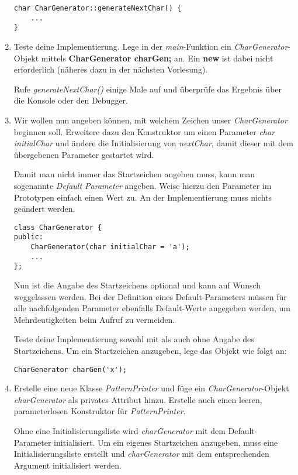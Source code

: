 \documentclass[
  accentcolor=tud1c,	%
  colorbacktitle,		%
  inverttitle,			%
  german,				%
  twoside
]{tudexercise}
\begin{document}
\begin{enumerate}
\begin{lstlisting}
char CharGenerator::generateNextChar() {
	...
}
\end{lstlisting}

\item
Teste deine Implementierung.
Lege in der \emph{main}-Funktion ein \emph{CharGenerator}-Objekt mittels \textbf{CharGenerator charGen;} an.
Ein \textbf{new} ist dabei nicht erforderlich (näheres dazu in der nächsten Vorlesung).

Rufe \emph{generateNextChar()} einige Male auf und überprüfe das Ergebnis über die Konsole oder den Debugger.

\item
Wir wollen nun angeben können, mit welchem Zeichen unser \emph{CharGenerator} beginnen soll.
Erweitere dazu den Konstruktor um einen Parameter \emph{char initialChar} und ändere die Initialisierung von \emph{nextChar}, damit dieser mit dem übergebenen Parameter gestartet wird.

Damit man nicht immer das Startzeichen angeben muss, kann man sogenannte \emph{Default Parameter} angeben.
Weise hierzu den Parameter im Prototypen einfach einen Wert zu.
An der Implementierung muss nichts geändert werden.
\begin{lstlisting}
class CharGenerator {
public:
	CharGenerator(char initialChar = 'a');
	...
};
\end{lstlisting}

Nun ist die Angabe des Startzeichens optional und kann auf Wunsch weggelassen werden.
Bei der Definition eines Default-Parameters müssen für alle nachfolgenden Parameter ebenfalls Default-Werte angegeben werden, um Mehrdeutigkeiten beim Aufruf zu vermeiden. 

Teste deine Implementierung sowohl mit als auch ohne Angabe des Startzeichens.
Um ein Startzeichen anzugeben, lege das Objekt wie folgt an:
\begin{lstlisting}
CharGenerator charGen('x');
\end{lstlisting}


\item
Erstelle eine neue Klasse \emph{PatternPrinter} und füge ein \emph{CharGenerator}-Objekt \emph{charGenerator} als privates Attribut hinzu.
Erstelle auch einen leeren, parameterlosen Konstruktor für \emph{PatternPrinter}.

Ohne eine Initialisierungsliste wird \emph{charGenerator} mit dem Default-Parameter initialisiert.
Um ein eigenes Startzeichen anzugeben, muss eine Initialisierungsliste erstellt und \emph{charGenerator} mit dem entsprechenden Argument initialisiert werden.


\end{enumerate}
\end{document}
